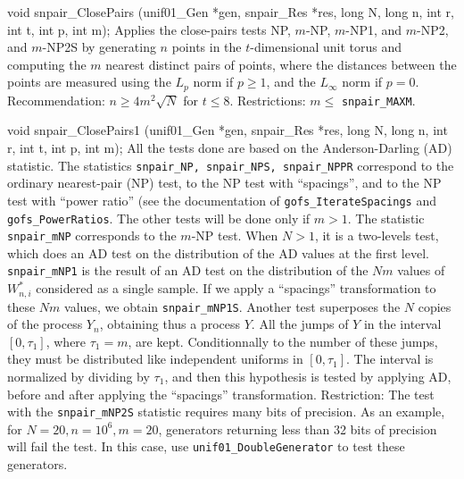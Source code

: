 void snpair_ClosePairs (unif01_Gen *gen, snpair_Res *res,
                        long N, long n, int r, int t, int p, int m);
\endcode
 \tab Applies the close-pairs tests NP, $m$-NP, $m$-NP1, and $m$-NP2,
   and $m$-NP2S
   by generating $n$ points in the $t$-dimensional unit torus
   and computing the $m$ nearest distinct pairs of points, where
   the distances between the points are measured using the
   $L_p$ norm if $p \ge 1$, and the $L_\infty$ norm if $p=0$.
   Recommendation:  $n \ge 4m^2 \sqrt{N}$ for $t\le 8$.
   Restrictions:  $m\le$ {\tt snpair\_MAXM}.
 \endtab
\hide  %
\code


void snpair_ClosePairs1 (unif01_Gen *gen, snpair_Res *res,
                         long N, long n, int r, int t, int p, int m);
\endcode
 \tab
   All the tests done are  based on the Anderson-Darling (AD) statistic.
   The statistics {\tt snpair\_NP, snpair\_NPS, snpair\_NPPR}
   correspond to the ordinary nearest-pair
   (NP) test, to the NP test with  ``spacings'', and to the NP test with
    ``power ratio'' (see the documentation of
   {\tt gofs\_IterateSpacings} and  {\tt gofs\_PowerRatios}.
   The other tests will be done only if $m > 1$.
   The statistic {\tt snpair\_mNP} corresponds to the $m$-NP test.
   When $N > 1$, it is a two-levels test, which does an AD test
   on the distribution of the AD values at the first level.
   {\tt snpair\_mNP1} is the result of an AD test on the distribution
   of the $Nm$ values of $W^*_{n,i}$ considered as a single sample.
   If we apply a ``spacings'' transformation  to these
   $Nm$ values, we obtain {\tt snpair\_mNP1S}.
   Another test superposes the $N$ copies of the process $Y_n$,
   obtaining thus a process $Y$.  All the jumps of $Y$
   in the interval $[0, \tau_1]$, where $\tau_1 = m$, are kept.
   Conditionnally  to the number of these jumps, they must be distributed
   like independent uniforms  in $[0,\tau_1]$.
   The interval is normalized by dividing by $\tau_1$, and then
   this hypothesis is tested by applying AD, before and after applying the
   ``spacings'' transformation.
   Restriction: The test with the {\tt snpair\_mNP2S} statistic requires
   many bits of precision.  As an example, for $N=20, n=10^6, m=20$,
   generators returning less than 32 bits of precision will fail the
   test. In this case, use {\tt unif01\_DoubleGenerator} to test these
   generators.
 \endtab
\code

